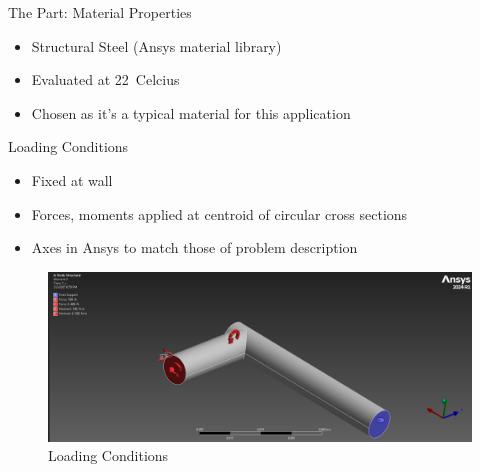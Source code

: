 \documentclass[11pt]{beamer}
\begin{document}
    \begin{frame}{The Part: Material Properties}
        \begin{itemize}
            \item Structural Steel (Ansys material library)
            \item Evaluated at 22\textdegree\ Celcius
            \item Chosen as it's a typical material for this application
        \end{itemize}
        \begin{table}
            \caption{Structural Steel Properties}
        \end{table}
    \end{frame}

    \begin{frame}{Loading Conditions}
        \begin{itemize}
            \item Fixed at wall
            \item Forces, moments applied at centroid of circular cross sections
            \item Axes in Ansys to match those of problem description
        \end{itemize}
        \begin{figure}
            \centering
            \includegraphics[scale=0.25]{figs/loading_condition_ansys_cropped.png}
            \caption{Loading Conditions}
        \end{figure}
    \end{frame}
\end{document}

